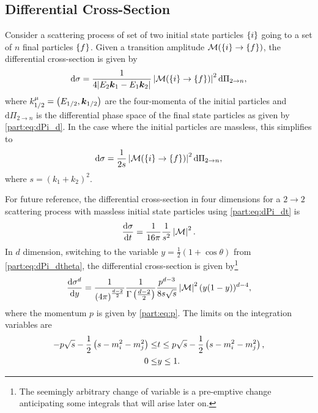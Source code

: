 \documentclass[../main.tex]{subfiles}
\begin{document}
\subsection{Differential Cross-Section}
Consider a scattering process of set of two initial state particles \(\left\{i\right\}\) going to a set of \(n\) final particles \(\left\{f\right\}\).
Given a transition amplitude \(\mathcal{M}(\left\{i\right\} \to \left\{f\right\})\), the differential cross-section is given by~\cite{Schwartz:2014sze}
\begin{equation}
  \mathrm{d}\sigma = \frac{1}{4|E_2 \boldsymbol{k}_1 - E_1\boldsymbol{k}_2|} \left|\mathcal{M}(\left\{i\right\} \to \left\{f\right\})\right|^2 \mathrm{d}\Pi_{2 \to n},
\end{equation}
where \(k_{1/2}^\mu = \left(E_{1/2}, \boldsymbol{k}_{1/2}\right)\) are the four-momenta of the initial particles and \(\mathrm{d}\Pi_{2 \to n}\) is the differential phase space of the final state particles as given by \cref{part:eq:dPi_d}.
In the case where the initial particles are massless, this simplifies to
\begin{equation}
  \label{part:eq:diff_xsec_formula}
  \mathrm{d}\sigma = \frac{1}{2s} \abs{\M(\cclosed{i} \to \cclosed{f})}^2 \mathrm{d}\Pi_{2 \to n},
\end{equation}
where \(s = (k_1 + k_2)^2\).

For future reference, the differential cross-section in four dimensions for a \(2\to 2\) scattering process with massless initial state particles using \cref{part:eq:dPi_dt} is
\begin{equation}
  \label{part:eq:dsigma_dt}
  \d[t]{\sigma} = \frac{1}{16\pi} \frac{1}{s^2} \abs{\M}^2.
\end{equation}
In \(d\) dimension, switching to the variable \(y = \frac{1}{2}(1+\cos\theta)\) from \cref{part:eq:dPi_dtheta}, the differential cross-section is given by\footnote{The seemingly arbitrary change of variable is a pre-emptive change anticipating some integrals that will arise later on.}
\begin{equation}
  \label{part:eq:dsigma_dy}
  \d[y]{\sigma^d} = \frac{1}{\pclosed{4\pi}^{\frac{d-2}{2}}} \frac{1}{\Gamma\pclosed{\frac{d-2}{2}}} \frac{p^{d-3}}{8s\sqrt{s}} \abs{\M}^2 (y(1-y))^{d-4},
\end{equation}
where the momentum \(p\) is given by \cref{part:eq:p}.
The limits on the integration variables are
\begin{subequations}
  \begin{align}
    -p\sqrt{s} - \frac{1}{2}\left(s - m_i^2 - m_j^2\right) \leq & t \leq p\sqrt{s} - \frac{1}{2}\left(s - m_i^2 - m_j^2\right), \\
    0 \leq                                                   & y \leq 1.
  \end{align}
\end{subequations}
\end{document}
